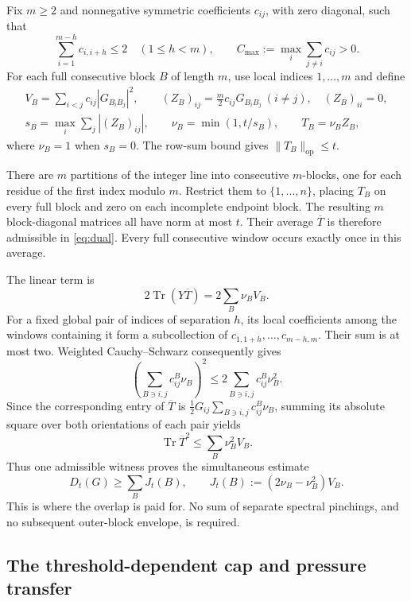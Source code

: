 \documentclass[11pt]{amsart}
\numberwithin{equation}{section}
\newcommand{\Tr}{\operatorname{Tr}}
\newcommand{\op}{\mathrm{op}}
\begin{document}
Fix $m\ge2$ and nonnegative symmetric coefficients $c_{ij}$, with zero
diagonal, such that
\begin{equation}
 \sum_{i=1}^{m-h}c_{i,i+h}\le2\quad(1\le h<m),\qquad
 C_{\max}:=\max_i\sum_{j\ne i}c_{ij}>0.
 \label{eq:capacity}
\end{equation}
For each full consecutive block $B$ of length $m$, use local indices
$1,\ldots,m$ and define
\begin{gather}
 V_B=\sum_{i<j}c_{ij}|G_{B_iB_j}|^2,\qquad
 (Z_B)_{ij}=\tfrac m2c_{ij}G_{B_iB_j}\ (i\ne j),
 \quad (Z_B)_{ii}=0,\label{eq:localwitness}\\
 s_B=\max_i\sum_j|(Z_B)_{ij}|,\qquad
 \nu_B=\min(1,t/s_B),\qquad T_B=\nu_B Z_B,
 \label{eq:nu}
\end{gather}
where $\nu_B=1$ when $s_B=0$. The row-sum bound gives
$\|T_B\|_\op\le t$.

There are $m$ partitions of the integer line into consecutive $m$-blocks,
one for each residue of the first index modulo $m$. Restrict them to
$\{1,\ldots,n\}$, placing $T_B$ on every full block and zero on each
incomplete endpoint block. The resulting $m$ block-diagonal matrices
all have norm at most $t$. Their average $\overline T$ is therefore
admissible in \eqref{eq:dual}. Every full consecutive window occurs
exactly once in this average.

The linear term is
\[
 2\Tr(Y\overline T)=2\sum_B\nu_B V_B.
\]
For a fixed global pair of indices of separation $h$, its local
coefficients among the windows containing it form a subcollection of
$c_{1,1+h},\ldots,c_{m-h,m}$. Their sum is at most two. Weighted
Cauchy--Schwarz consequently gives
\[
 \left(\sum_{B\ni i,j}c_{ij}^{B}\nu_B\right)^2
 \le2\sum_{B\ni i,j}c_{ij}^{B}\nu_B^2.
\]
Since the corresponding entry of $\overline T$ is
$\frac12G_{ij}\sum_{B\ni i,j}c_{ij}^{B}\nu_B$, summing its absolute
square over both orientations of each pair yields
\[
 \Tr\overline T^2\le\sum_B\nu_B^2V_B.
\]
Thus one admissible witness proves the simultaneous estimate
\begin{equation}
 D_t(G)\ge\sum_B J_t(B),\qquad
 J_t(B):=(2\nu_B-\nu_B^2)V_B.\label{eq:commonwitness}
\end{equation}
This is where the overlap is paid for. No sum of separate spectral
pinchings, and no subsequent outer-block envelope, is required.

\subsection{The threshold-dependent cap and pressure transfer}
\end{document}

